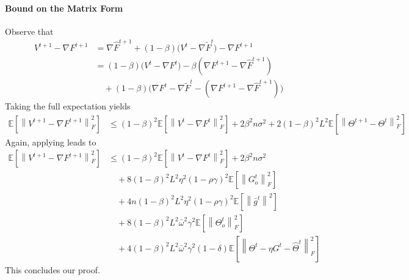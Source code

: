 \documentclass[10pt]{article} %
\theoremstyle{plain}
\theoremstyle{definition}
\theoremstyle{remark}
\newcommand{\grdF}{\nabla F}
\newcommand{\bw}{\bar{\omega}}
\newcommand{\avgg}{\bar{g}}
\newcommand{\norm}[1]{\left\| #1 \right\|}
\newcommand{\nl}{\nonumber\\}
\newcommand{\stocgrdF}{\nabla \widehat{F}}
\newcommand{\stocgrdFp}{\nabla \widetilde{F}}
\newcommand{\blu}{\color{blue}}
\newcommand{\re}{\color{red}}
\begin{document}
\paragraph{Bound on the Matrix Form} Observe that 
\begin{align}
    V^{t+1} - \grdF^{t+1} & = \stocgrdF^{t+1} + (1-\beta) \big( V^t - \stocgrdFp^{t} \big) - \grdF^{t+1} \\
    & = (1-\beta) \big( V^t - \grdF^t \big) - \beta ( \grdF^{t+1} - \stocgrdF^{t+1} ) \nl
    & \quad + (1-\beta) \big( \grdF^t - \stocgrdFp^t - ( \grdF^{t+1} - \stocgrdF^{t+1} ) \big) \nonumber
\end{align}
Taking the full expectation yields 
\begin{align*}
    \mathbb{E} \left[ \norm{ V^{t+1} - \grdF^{t+1} }_F^2 \right] & \leq (1-\beta)^2 \mathbb{E} \left[ \norm{ V^{t} - \grdF^{t} }_F^2 \right] + 2 \beta^2 n \sigma^2 + 2 (1-\beta)^2 L^2 \mathbb{E} \left[ \norm{ \Theta^{t+1} - \Theta^t }_F^2 \right]
\end{align*}
Again, applying  leads to 
\begin{equation} \label{eq:vtmatform} 
\begin{split}
    \mathbb{E} \left[ \norm{ V^{t+1} - \grdF^{t+1} }_F^2 \right] & \leq (1-\beta)^2 \mathbb{E} \left[ \norm{ V^{t} - \grdF^{t} }_F^2 \right] + 2 \beta^2 n \sigma^2 \\
    & \quad + 8 (1-\beta)^2 L^2 \eta^2(1-\rho\gamma)^2 \mathbb{E} \left[ \norm{G_o^t}_F^2 \right] \\
    & \quad + 4n (1-\beta)^2 L^2 \eta^2(1-\rho\gamma)^2 \mathbb{E} \left[ \norm{ \avgg^t }^2 \right] \\
    & \quad + 8 (1-\beta)^2 L^2 \bw^2 \gamma^2 \mathbb{E} \left[ \norm{\Theta_o^t}_F^2 \right] \\
    & \quad + 4 (1-\beta)^2 L^2 \bw^2 \gamma^2(1-\delta) \mathbb{E} \left[ \norm{\Theta^t - \eta G^t - \hat{\Theta}^t}_F^2 \right]
\end{split}
\end{equation}
This concludes our proof.
\end{document}
